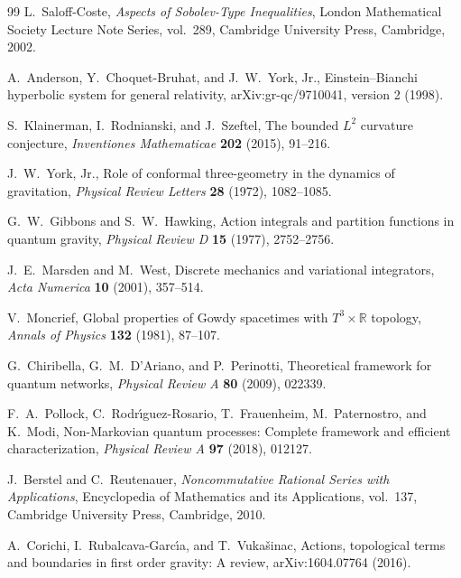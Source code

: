 \documentclass[11pt]{article}
\numberwithin{equation}{section}
\theoremstyle{definition}
\theoremstyle{remark}
\begin{document}
\begin{thebibliography}{99}
L.~Saloff-Coste,
\newblock \emph{Aspects of Sobolev-Type Inequalities},
\newblock London Mathematical Society Lecture Note Series, vol.~289,
Cambridge University Press, Cambridge, 2002.

A.~Anderson, Y.~Choquet-Bruhat, and J.~W.~York, Jr.,
\newblock Einstein--Bianchi hyperbolic system for general relativity,
\newblock arXiv:gr-qc/9710041, version 2 (1998).

S.~Klainerman, I.~Rodnianski, and J.~Szeftel,
\newblock The bounded $L^2$ curvature conjecture,
\newblock \emph{Inventiones Mathematicae} \textbf{202} (2015), 91--216.

J.~W.~York, Jr.,
\newblock Role of conformal three-geometry in the dynamics of gravitation,
\newblock \emph{Physical Review Letters} \textbf{28} (1972), 1082--1085.

G.~W.~Gibbons and S.~W.~Hawking,
\newblock Action integrals and partition functions in quantum gravity,
\newblock \emph{Physical Review D} \textbf{15} (1977), 2752--2756.

J.~E.~Marsden and M.~West,
\newblock Discrete mechanics and variational integrators,
\newblock \emph{Acta Numerica} \textbf{10} (2001), 357--514.

V.~Moncrief,
\newblock Global properties of Gowdy spacetimes with $T^3\times\mathbb R$ topology,
\newblock \emph{Annals of Physics} \textbf{132} (1981), 87--107.

G.~Chiribella, G.~M.~D'Ariano, and P.~Perinotti,
\newblock Theoretical framework for quantum networks,
\newblock \emph{Physical Review A} \textbf{80} (2009), 022339.

F.~A.~Pollock, C.~Rodr\'{\i}guez-Rosario, T.~Frauenheim,
M.~Paternostro, and K.~Modi,
\newblock Non-Markovian quantum processes: Complete framework and efficient
characterization,
\newblock \emph{Physical Review A} \textbf{97} (2018), 012127.

J.~Berstel and C.~Reutenauer,
\newblock \emph{Noncommutative Rational Series with Applications},
\newblock Encyclopedia of Mathematics and its Applications, vol.~137,
Cambridge University Press, Cambridge, 2010.

A.~Corichi, I.~Rubalcava-Garc\'{\i}a, and T.~Vuka\v{s}inac,
\newblock Actions, topological terms and boundaries in first order gravity:
A review,
\newblock arXiv:1604.07764 (2016).


\end{thebibliography}
\end{document}
